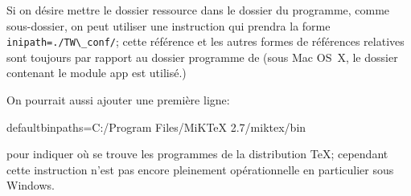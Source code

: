 Si on désire mettre le dossier ressource dans le dossier du programme, comme sous-dossier, on peut utiliser une instruction qui prendra la forme \verb|inipath=./TW\_conf/|; cette référence et les autres formes de références relatives sont toujours par rapport au dossier programme de \Tw (sous Mac OS~X, le dossier contenant le module app est utilisé.)

On pourrait aussi ajouter une première ligne:
\begin{verbExample}
defaultbinpaths=C:/Program Files/MiKTeX 2.7/miktex/bin
\end{verbExample}
pour indiquer où se trouve les programmes de la distribution \TeX; cependant cette instruction n'est pas encore pleinement opérationnelle en particulier sous Windows.

